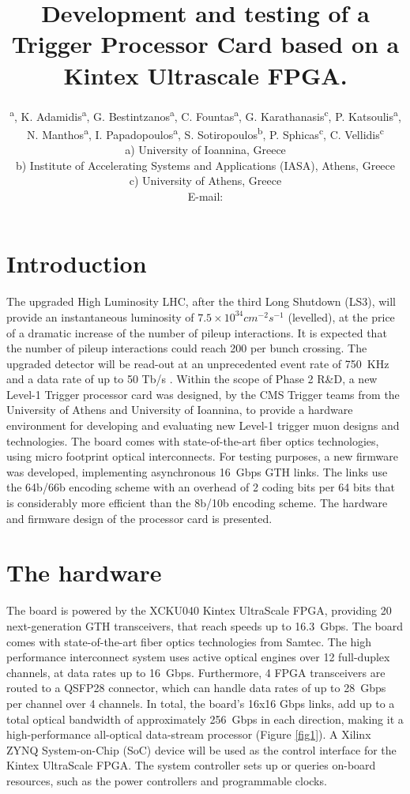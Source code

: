 \documentclass[a4paper]{PoS}
\title{Development and testing of a Trigger Processor Card based on a Kintex Ultrascale FPGA.}
\author{\speaker{S. Mallios}\textsuperscript{ a}, K. Adamidis\textsuperscript{a}, G. Bestintzanos\textsuperscript{a}, C. Fountas\textsuperscript{a}, G. Karathanasis\textsuperscript{c}, P. Katsoulis\textsuperscript{a}, N. Manthos\textsuperscript{a}, I. Papadopoulos\textsuperscript{a}, S. Sotiropoulos\textsuperscript{b}, P. Sphicas\textsuperscript{c}, C. Vellidis\textsuperscript{c}\\
\llap a) University of Ioannina, Greece\\
\llap b) Institute of Accelerating Systems and Applications (IASA), Athens, Greece\\
\llap c) University of Athens, Greece\\
E-mail: \email{stavros.mallios@cern.ch}}
\begin{document}


\section{Introduction}
The upgraded High Luminosity LHC, after the third Long Shutdown (LS3), will provide an instantaneous luminosity of $7.5 \times 10^{34} cm^{-2} s^{-1}$ (levelled), at the price of a dramatic increase of the number of pileup interactions. It is expected that the number of pileup interactions could reach 200 per bunch crossing. The upgraded detector will be read-out at an unprecedented event rate of 750~KHz and a data rate of up to 50 Tb/s \cite{Collaboration:2283192}. Within the scope of Phase 2 R\&D, a new Level-1 Trigger processor card was designed, by the CMS Trigger teams from the University of Athens and University of Ioannina, to provide a hardware environment for developing and evaluating new Level-1 trigger muon designs and technologies. The board comes with state-of-the-art fiber optics technologies, using micro footprint optical interconnects. For testing purposes, a new firmware was developed, implementing asynchronous 16~Gbps GTH links. The links use the 64b/66b encoding scheme with an overhead of 2 coding bits per 64 bits that is considerably more efficient than the 8b/10b encoding scheme. The hardware and firmware design of the processor card is presented.

\section{The hardware}
The board is powered by the XCKU040 Kintex UltraScale FPGA, providing 20 next-generation GTH transceivers, that reach speeds up to 16.3~Gbps. The board comes with state-of-the-art fiber optics technologies from Samtec. The high performance interconnect system uses active optical engines over 12 full-duplex channels, at data rates up to 16~Gbps. Furthermore, 4 FPGA transceivers are routed to a QSFP28 connector, which can handle data rates of up to 28~Gbps per channel over 4 channels. In total, the board's 16x16 Gbps links, add up to a total optical bandwidth of approximately 256~Gbps in each direction, making it a high-performance all-optical data-stream processor (Figure \ref{fig1}). A Xilinx ZYNQ System-on-Chip (SoC) device will be used as the control interface for the Kintex UltraScale FPGA. The system controller sets up or queries on-board resources, such as the power controllers and programmable clocks.
\end{document}
